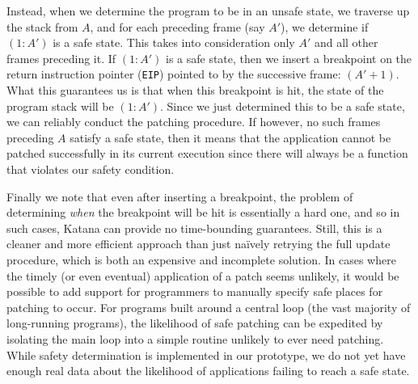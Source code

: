 Instead, when we determine the program to be in an unsafe state, we
traverse up the stack from $A$, and for each preceding frame (say
$A'$), we determine if $(1:A')$ is a safe state. This takes into
consideration only $A'$ and all other frames preceding it. If $(1:A')$
is a safe state, then we insert a breakpoint on the return instruction
pointer ({\tt EIP}) pointed to by the successive frame: $(A' +
1)$. What this guarantees us is that when this breakpoint is hit, the
state of the program stack will be $(1:A')$. Since we just determined
this to be a safe state, we can reliably conduct the patching
procedure. If however, no such frames preceding $A$ satisfy a safe
state, then it means that the application cannot be patched
successfully in its current execution since there will always be a
function that violates our safety condition.

Finally we note that even after inserting a breakpoint, the problem of
determining {\it when} the breakpoint will be hit is essentially a
hard one, and so in such cases, Katana can provide no time-bounding
guarantees. Still, this is a cleaner and more efficient approach than
just na\"{i}vely retrying the full update procedure, which is both an
expensive and incomplete solution.
In cases where the timely (or even eventual) application of a patch
seems unlikely, it would be possible to add support for programmers to
manually specify safe places for patching to occur. For programs built
around a central loop (the vast majority of long-running programs),
the likelihood of safe patching can be expedited by isolating the main
loop into a simple routine unlikely to ever need patching. While
safety determination is implemented in our prototype, we do not yet
have enough real data about the likelihood of applications failing to
reach a safe state.


